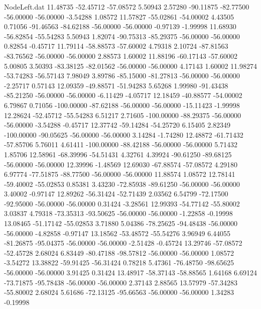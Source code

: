 \begin{filecontents}{NodeLeft.dat}
  11.48735  -52.45712  -57.08572     5.50943    2.57280  -90.11875  -82.77500  -56.00000  -56.00000   -3.54288    1.08572
  11.57827  -55.02861  -54.00002     4.43505    0.71056  -91.46563  -84.62188  -56.00000  -56.00000   -0.97139   -1.99998
  11.68930  -56.82854  -55.54283     5.50943    1.82074  -90.75313  -85.29375  -56.00000  -56.00000    0.82854   -0.45717
  11.79114  -58.88573  -57.60002     4.79318    2.10724  -87.81563  -83.76562  -56.00000  -56.00000    2.88573    1.60002
  11.88196  -60.17143  -57.60002     5.00805    3.50393  -83.38125  -82.01562  -56.00000  -56.00000    4.17143    1.60002
  11.98274  -53.74283  -56.57143     7.98049    3.89786  -85.15000  -81.27813  -56.00000  -56.00000   -2.25717    0.57143
  12.09359  -49.88571  -51.94283     5.65268    1.99980  -91.43438  -85.21250  -56.00000  -56.00000   -6.11429   -4.05717
  12.18459  -40.88577  -54.00002     6.79867    0.71056 -100.00000  -87.62188  -56.00000  -56.00000  -15.11423   -1.99998
  12.28624  -52.45712  -55.54283     6.51217    2.71605 -100.00000  -88.29375  -56.00000  -56.00000   -3.54288   -0.45717
  12.37742  -59.14284  -54.25720     6.15405    2.82349 -100.00000  -90.05625  -56.00000  -56.00000    3.14284   -1.74280
  12.48872  -61.71432  -57.85706     5.76011    4.61411 -100.00000  -88.42188  -56.00000  -56.00000    5.71432    1.85706
  12.58961  -68.39996  -54.51431     4.32761    4.39924  -90.61250  -89.68125  -56.00000  -56.00000   12.39996   -1.48569
  12.69030  -67.88574  -57.08572     4.29180    6.97774  -77.51875  -88.77500  -56.00000  -56.00000   11.88574    1.08572
  12.78141  -59.40002  -55.02853     0.85381    3.43230  -72.85938  -89.61250  -56.00000  -56.00000    3.40002   -0.97147
  12.89262  -56.31424  -52.71439     2.03562    6.54799  -72.17500  -92.95000  -56.00000  -56.00000    0.31424   -3.28561
  12.99393  -54.77142  -55.80002     3.03837    4.79318  -73.35313  -93.50625  -56.00000  -56.00000   -1.22858   -0.19998
  13.08465  -51.17142  -55.02853     3.71880    5.04386  -78.25625  -94.48438  -56.00000  -56.00000   -4.82858   -0.97147
  13.18562  -53.48572  -55.54276     3.96949    6.44055  -81.26875  -95.04375  -56.00000  -56.00000   -2.51428   -0.45724
  13.29746  -57.08572  -52.45728     2.68024    6.83449  -80.47188  -98.57812  -56.00000  -56.00000    1.08572   -3.54272
  13.38822  -59.91425  -56.31424     0.78218    5.47361  -76.48750  -98.65625  -56.00000  -56.00000    3.91425    0.31424
  13.48917  -58.37143  -58.88565     1.64168    6.69124  -73.71875  -95.78438  -56.00000  -56.00000    2.37143    2.88565
  13.57979  -57.34283  -55.80002     2.68024    5.61686  -72.13125  -95.66563  -56.00000  -56.00000    1.34283   -0.19998

\end{filecontents}
